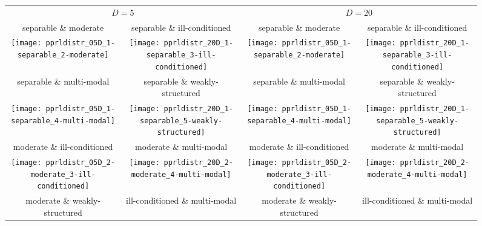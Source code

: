 \documentclass{sig-alternate}
\begin{document}
\begin{figure*}
\begin{tabular}{@{\hspace*{-0.005\textwidth}}c@{\hspace*{-0.025\textwidth}}c@{\hspace*{-0.00\textwidth}}|c@{\hspace*{-0.025\textwidth}}c}
\multicolumn{2}{c}{$D=5$} & \multicolumn{2}{c}{$D=20$}\\[-0.5ex]
\small separable \& moderate & \small separable \& ill-conditioned & \small separable \& moderate & \small separable \& ill-conditioned\\ 
\texttt{[image: pprldistr\_05D\_1-separable\_2-moderate]} &
\texttt{[image: pprldistr\_20D\_1-separable\_3-ill-conditioned]} &
\texttt{[image: pprldistr\_05D\_1-separable\_2-moderate]} &
\texttt{[image: pprldistr\_20D\_1-separable\_3-ill-conditioned]} \\
\small separable \& multi-modal & \small separable \& weakly-structured & \small separable \& multi-modal & \small separable \& weakly-structured\\ 
\texttt{[image: pprldistr\_05D\_1-separable\_4-multi-modal]} &
\texttt{[image: pprldistr\_20D\_1-separable\_5-weakly-structured]} &
\texttt{[image: pprldistr\_05D\_1-separable\_4-multi-modal]} &
\texttt{[image: pprldistr\_20D\_1-separable\_5-weakly-structured]} \\
\small moderate \& ill-conditioned & \small moderate \& multi-modal & \small moderate \& ill-conditioned & \small moderate \& multi-modal\\ 
\texttt{[image: pprldistr\_05D\_2-moderate\_3-ill-conditioned]} &
\texttt{[image: pprldistr\_20D\_2-moderate\_4-multi-modal]} &
\texttt{[image: pprldistr\_05D\_2-moderate\_3-ill-conditioned]} &
\texttt{[image: pprldistr\_20D\_2-moderate\_4-multi-modal]} \\
\small moderate \& weakly-structured & \small ill-conditioned \& multi-modal & \small moderate \& weakly-structured & \small ill-conditioned \& multi-modal\\ 

\end{tabular}
\end{figure*}
\end{document}
